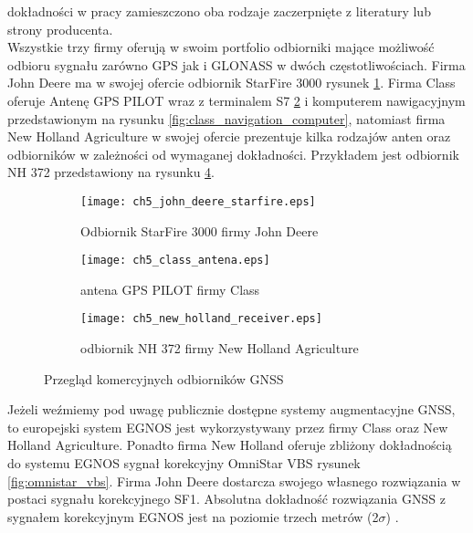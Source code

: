 dokładności w pracy zamieszczono oba rodzaje zaczerpnięte z literatury lub strony producenta.\\
\indent Wszystkie trzy firmy oferują w swoim portfolio odbiorniki mające możliwość odbioru sygnału zarówno GPS jak i GLONASS w dwóch częstotliwościach.
Firma John Deere ma w swojej ofercie odbiornik StarFire 3000 rysunek \ref{fig:john_deere_starfire}. Firma Class oferuje Antenę GPS PILOT wraz z terminalem S7
\ref{fig:class_antena} i komputerem nawigacyjnym przedstawionym na rysunku \ref{fig:class_navigation_computer}, natomiast 
firma New Holland Agriculture w swojej ofercie prezentuje kilka rodzajów anten oraz odbiorników w zależności od wymaganej dokładności. Przykładem jest odbiornik 
NH 372 przedstawiony na rysunku \ref{fig:new_holland_nh372}.
\begin{figure}[H]
\centering
        \begin{subfigure}{0.3\textwidth}
                \centering
                \texttt{[image: ch5\_john\_deere\_starfire.eps]}
                \caption{Odbiornik StarFire 3000 firmy John Deere}
                \label{fig:john_deere_starfire}
        \end{subfigure}
        \begin{subfigure}{0.3\textwidth}
                \centering
                \texttt{[image: ch5\_class\_antena.eps]}
                \caption{antena GPS PILOT firmy Class}
                \label{fig:class_antena}
        \end{subfigure}
        \begin{subfigure}{0.3\textwidth}
                \centering
                \texttt{[image: ch5\_new\_holland\_receiver.eps]}
                \caption{odbiornik NH 372 firmy New Holland Agriculture}
                \label{fig:new_holland_nh372}
        \end{subfigure}
\caption{Przegląd komercyjnych odbiorników GNSS}
\end{figure}
\indent Jeżeli weźmiemy pod uwagę publicznie dostępne systemy augmentacyjne GNSS, to europejski system EGNOS jest wykorzystywany 
przez firmy Class oraz New Holland Agriculture. Ponadto firma New Holland oferuje zbliżony dokładnością do systemu EGNOS sygnał korekcyjny OmniStar VBS rysunek
\ref{fig:omnistar_vbs}. Firma John Deere dostarcza swojego własnego rozwiązania w postaci sygnału 
korekcyjnego SF1. Absolutna dokładność rozwiązania GNSS z sygnałem korekcyjnym EGNOS jest na poziomie trzech metrów (2$\sigma$) \cite[]{EGNOS}.
